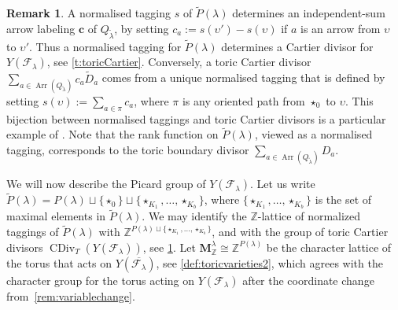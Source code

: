 \documentclass{amsart}
\theoremstyle{definition}
\newtheorem{remark}[thm]{Remark}
\numberwithin{equation}{section}
\newcommand{\vv}{\upsilon}
\newcommand{\Arr}{\operatorname{Arr}}
\newcommand{\FF}{\mathcal{F}}
\newcommand{\Z}{\mathbb{Z}}
\begin{document}
\begin{remark}\label{r:tagging} A normalised tagging $s$ of $\widetilde P(\lambda)$ determines an independent-sum arrow labeling $\mathbf c$ of $Q_{\widetilde \lambda}$, by setting $c_a:=s(\vv')-s(\vv)$ 
if $a$ is an arrow from $\vv$ to $\vv'$. Thus a normalised tagging for $\widetilde P(\lambda)$  determines a Cartier divisor for $Y(\FF_\lambda)$, see \cref{t:toricCartier}. Conversely, a toric Cartier divisor $\sum_{a\in\Arr(Q_{\widetilde\lambda})}c_a\widetilde D_a$ comes from a unique normalised tagging that is defined by setting $s(\vv):=\sum_{a\in\pi}c_a$, where $\pi$ is any oriented path from $\star_0$ to $\vv$. This bijection between normalised taggings and toric Cartier divisors is a particular example of \cite[Remark 5.19]{RWReflexive}. Note that the rank function on $\widetilde P(\lambda)$, viewed as a normalised tagging, corresponds to the toric boundary divisor $\sum_{a\in\Arr(Q_{\widetilde \lambda})} D_a$.   \end{remark}




We will now describe the Picard group of $Y(\FF_\lambda)$. Let us write $\widetilde{P}(\lambda)=P(\lambda)\sqcup\{\star_0\}\sqcup\{\star_{K_1},\dotsc,\star_{K_b}\}$, where $\{\star_{K_1},\dotsc,\star_{K_b}\}$ is the set of maximal elements in $\widetilde {P}(\lambda)$. We may identify the $\Z$-lattice of normalized taggings of $\widetilde P(\lambda)$ with $\Z^{P(\lambda)\sqcup\{\star_{K_1},\dotsc,\star_{K_b} \}}$, and with the group of toric Cartier divisors $\operatorname{CDiv}_T(Y(\FF_\lambda))$, see \cref{r:tagging}. Let  $\mathbf M^\lambda_\Z\cong\Z^{P(\lambda)}$ be the character lattice of the torus that acts on $Y(\overline{\FF_\lambda})$, see 
\cref{def:toricvarieties2}, which agrees with the character group for the torus acting on $Y(\FF_\lambda)$ after the coordinate change from~\cref{rem:variablechange}.
\end{document}
